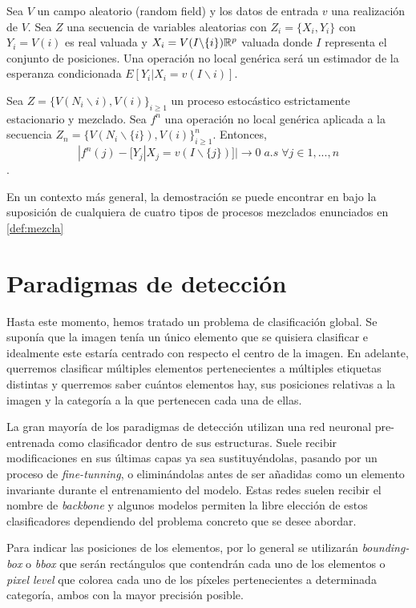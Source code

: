 Sea $V$ un campo aleatorio (random field) y los datos de entrada $v$ una realización de $V$. Sea $Z$ una secuencia de variables aleatorias con $Z_i=\{X_i,Y_i\}$ con $Y_i=V(i)$ es real valuada y $X_i=V(I\backslash \{i\}) \mathbb{R}^p$ valuada donde $I$ representa el conjunto de posiciones. Una operación no local genérica será un estimador de la esperanza condicionada $E[Y_i|X_i=v(I\backslash{i})]$.

\begin{teorema}
Sea $Z=\{V(N_i\backslash{i}),V(i)\}_{i\ge 1}$ un proceso estocástico estrictamente estacionario y mezclado. Sea $f^n$ una operación no local genérica aplicada a la secuencia $Z_n=\{V(N_i\backslash\{i\}),V(i)\}_{i\ge 1}^n$. Entonces, $$ |f^n(j)-[Y_j|X_j=v(I\backslash \{j\})]| \to 0 \; a.s \;  \forall j \in{1,...,n}$$.
\end{teorema}

En un contexto más general, la demostración se puede encontrar en \cite{Buades:2005:NAI:1068508.1069066} bajo la suposición de cualquiera de cuatro tipos de procesos mezclados enunciados en \autoref{def:mezcla}

\chapter{Paradigmas de detección}
Hasta este momento, hemos tratado un problema de clasificación global. Se suponía que la imagen tenía un único elemento que se quisiera clasificar e idealmente este estaría centrado con respecto el centro de la imagen. En adelante, querremos clasificar múltiples elementos pertenecientes a múltiples etiquetas distintas y querremos saber cuántos elementos hay, sus posiciones relativas a la imagen y la categoría a la que pertenecen cada una de ellas.\newline

La gran mayoría de los paradigmas de detección utilizan una red neuronal pre-entrenada como clasificador dentro de sus estructuras. Suele recibir modificaciones en sus últimas capas ya sea sustituyéndolas, pasando por un proceso de \emph{fine-tunning}, o eliminándolas antes de ser añadidas como un elemento invariante durante el entrenamiento del modelo. Estas redes suelen recibir el nombre de \emph{backbone} y algunos modelos permiten la libre elección de estos clasificadores dependiendo del problema concreto que se desee abordar.\newline

Para indicar las posiciones de los elementos, por lo general se utilizarán \emph{bounding-box} o \emph{bbox} que serán rectángulos que contendrán cada uno de los elementos o \emph{pixel level} que colorea cada uno de los píxeles pertenecientes a determinada categoría, ambos con la mayor precisión posible.


